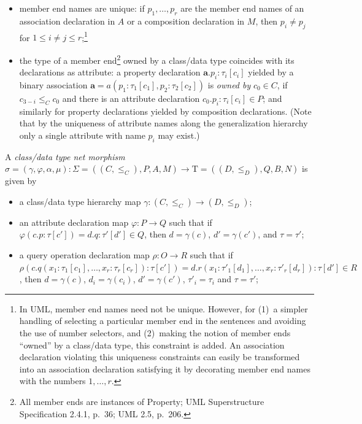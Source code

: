 \documentclass[10pt,fleqn,final]{scrreprt}
\newcommand{\cbs}[0]{\color{red}\xspace} %
\newcommand{\cbe}[0]{\color{black}\xspace} %
\newenvironment{definitions}[0]{\medskip }{}
\newcommand{\uml}[1]{\textsf{#1}}
\newcommand{\Tau}{\mathrm{T}}
\begin{document}
\begin{definitions}
\begin{itemize}[label={--}, leftmargin=*]
  \item member end names are unique: if $p_1, \ldots, p_r$ are the
member end names of an association declaration in $A$ or a composition
declaration in $M$, then $p_i \neq p_j$ for
$1 \leq i \neq j \leq r$;\footnote{In UML, member end names need not be
  unique.  However, for (1)~a simpler handling of selecting a particular
  member end in the sentences and avoiding the use of number selectors,
  and (2)~making the notion of member ends ``owned'' by a class/data
  type,\cbs this constraint is added.\cbe An association declaration violating this
  uniqueness constraints can easily be transformed into an association 
  declaration satisfying it by decorating member end names with the
  numbers $1,\ldots,r$.}

  \item the type of a member end\footnote{All member ends are instances
  of \uml{Property}; UML Superstructure Specification 2.4.1, p.~36; UML
  2.5, p.~206.}
owned by a class/data type coincides with its declarations as\cbs attribute:
a property\cbe declaration $\mathbf{a}.p_i : \tau_i[c_i]$
yielded by a binary association
$\mathbf{a} = a(p_1 : \tau_1[c_1], p_2 : \tau_2[c_2])$ is \emph{owned
  by} $c_0 \in C$\cbs{},\cbe if $c_{3-i} \leq_C c_0$ and there is an attribute
declaration $c_0.p_i : \tau_i[c_i] \in P$; and similarly for property
declarations yielded by composition declarations.  (Note that by the
uniqueness of attribute names along the generalization hierarchy only a
single attribute with name $p_i$ may exist.)
\end{itemize}

A \emph{class/data type net morphism}
$\sigma = (\gamma, \varphi, \alpha, \mu) : \Sigma = ((C,
{\leq}_C), P, A, M) \to \Tau = ((D, {\leq}_D),\allowbreak
Q,\allowbreak B, N)$ is given by
%
\begin{itemize}[label={--}, leftmargin=*]
  \item a class/data type hierarchy map $\gamma : (C, {\leq_C}) \to (D,
{\leq_D})$;

  \item an attribute declaration map $\varphi : P \to Q$ such that if
$\varphi({c.p : \tau[c']}) = {d.q : \tau'[d']} \in Q$, then
$d = \gamma(c)$, $d' = \gamma(c')$, and $\tau = \tau'$;

  \item a query operation declaration map $\rho : O \to R$ such that if
$\rho(c.q(x_1 : \tau_1[c_1], \dots, x_r : \tau_r[c_r]) : \tau[c']) =
d.r(x_1 : \tau'_1[d_1], \dots, x_r : \tau'_r[d_r]) : \tau[d'] \in R$, 
then $d = \gamma(c)$, $d_i = \gamma(c_i)$, 
$d' = \gamma(c')$, $\tau'_i = \tau_i$ and $\tau = \tau'$;


\end{itemize}
\end{definitions}
\end{document}
